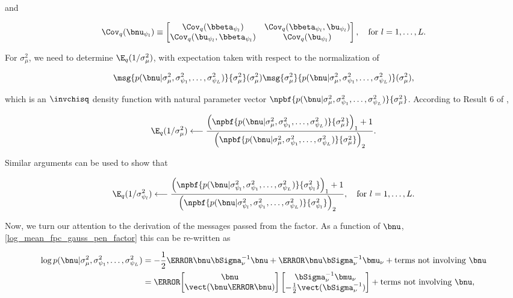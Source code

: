 \documentclass[12pt]{article}
\def\Sigmanu{\bSigma_{\nu}}
\def\munu{\bmu_{\nu}}
\def\sigsqmu{\sigma^2_{\mu}}
\newcommand\betapsi[1]{\bbeta_{\psi_{#1}}}
\newcommand\upsi[1]{\bu_{\psi_{#1}}}
\newcommand\nupsi[1]{\bnu_{\psi_{#1}}}
\newcommand\sigsqpsi[1]{\sigma^2_{\psi_{#1}}}
\newcommand\tni[1]{\text{terms not involving $#1$}}
\theoremstyle{plain}
\theoremstyle{definition}
\theoremstyle{remark}
\begin{document}
\noindent and

\begin{equation}
	\Cov_q (\nupsi{l}) \equiv \begin{bmatrix}
		\Cov_q (\betapsi{l}) & \Cov_q (\betapsi{l}, \upsi{l}) \\
		\Cov_q (\upsi{l}, \betapsi{l}) & \Cov_q (\upsi{l})
	\end{bmatrix}, \quad
	\text{for $l = 1, \dots, L$.}
\label{cov_betau_psi}
\end{equation}

\noindent For $\sigsqmu$, we need to determine
$\E_q (1/\sigsqmu)$, with expectation taken with respect to the normalization of

\[
	\msg{p(\bnu | \sigsqmu, \sigsqpsi{1}, \dots, \sigsqpsi{L})}{\sigsqmu} (\sigsqmu)
	\msg{\sigsqmu}{p(\bnu | \sigsqmu, \sigsqpsi{1}, \dots, \sigsqpsi{L})} (\sigsqmu),
\]

\noindent which is an $\invchisq$ density function with natural parameter vector
$\npbf{p(\bnu | \sigsqmu, \sigsqpsi{1}, \dots, \sigsqpsi{L})}{\sigsqmu}$. According to Result 6 of ,

\begin{equation}
	\E_q (1/\sigsqmu)
		\longleftarrow
			\frac{
				\left( \npbf{p(\bnu | \sigsqmu, \sigsqpsi{1}, \dots, \sigsqpsi{L})}{\sigsqmu} \right)_1 + 1
			}{
				\left( \npbf{p(\bnu | \sigsqmu, \sigsqpsi{1}, \dots, \sigsqpsi{L})}{\sigsqmu} \right)_2
			}.
\label{exp_pen_sigsqmu}
\end{equation}

\noindent Similar arguments can be used to show that

\begin{equation}
	\E_q (1/\sigsqpsi{l})
		\longleftarrow
			\frac{
				\left( \npbf{p(\bnu | \sigsqpsi{l}, \sigsqpsi{1}, \dots, \sigsqpsi{L})}{\sigsqpsi{l}} \right)_1 + 1
			}{
				\left( \npbf{p(\bnu | \sigsqpsi{l}, \sigsqpsi{1}, \dots, \sigsqpsi{L})}{\sigsqpsi{l}} \right)_2
			}, \quad \text{for $l = 1, \dots, L$.}
\label{exp_pen_sigsqpsi}
\end{equation}

Now, we turn our attention to the derivation of the messages passed from the factor. As a function of $\bnu$,
\eqref{log_mean_fpc_gauss_pen_factor} this can be re-written as

\begin{align*}
	\log p(\bnu | \sigsqmu, \sigsqpsi{1}, \dots, \sigsqpsi{L})
		& = -\frac12 \T{\bnu} \Sigmanu^{-1} \bnu + \T{\bnu} \Sigmanu^{-1} \munu + \tni{\bnu} \\
		& = \T{\begin{bmatrix}
			\bnu \\
			\vect (\bnu \T{\bnu})
		\end{bmatrix}} \begin{bmatrix}
			\Sigmanu^{-1} \munu \\
			-\frac12 \vect (\Sigmanu^{-1})
		\end{bmatrix} + \tni{\bnu},
\end{align*}
\end{document}
